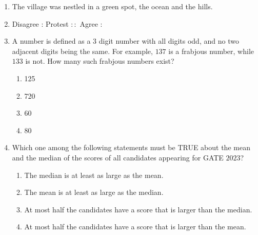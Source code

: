 \documentclass[journal,12pt,onecolumn]{IEEEtran}
\theoremstyle{remark}
\begin{document}
\begin{enumerate}[start=1, label=Q.\arabic*]

\item The village was nestled in a green spot, \underline{\hspace{2cm}} the ocean and the hills.

\begin{enumerate}
\end{enumerate}

\hfill{}


\item Disagree : Protest $::$ Agree : \underline{\hspace{2cm}} \quad {}

\begin{enumerate}
\end{enumerate}

\hfill{}

\item A  number is defined as a $3$ digit number with all digits odd, and no two adjacent digits being the same. For example, $137$ is a frabjous number, while $133$ is not. How many such frabjous numbers exist?
\begin{enumerate}
\item 125
\item 720
\item 60
\item 80
\end{enumerate}

\hfill{}


\item Which one among the following statements must be TRUE about the mean and the median of the scores of all candidates appearing for GATE $2023$?
\begin{enumerate}
\item The median is at least as large as the mean.
\item The mean is at least as large as the median.
\item At most half the candidates have a score that is larger than the median.
\item At most half the candidates have a score that is larger than the mean.
\end{enumerate}


\end{enumerate}
\end{document}

